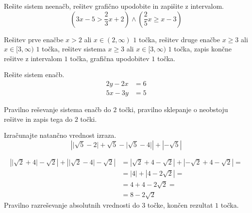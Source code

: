 \documentclass[addpoints]{exam}
\begin{document}
\begin{questions}
        

    \newpage
    \question[5]
    Rešite sistem neenačb, rešitev grafično upodobite in zapišite z intervalom.
    $$ \left(3x-5>\frac{2}{3}x+2\right)\land\left(\frac{2}{5}x\geq x-3\right) $$
    
    
    \begin{solution}[12cm]
        Rešitev prve enačbe $x>2$ ali $x\in(2,\infty)$ $1$ točka, rešitev druge enačbe $x\geq 3$ ali $x\in[3,\infty)$ $1$ točka, rešitev sistema $x\geq 3$ ali $x\in[3,\infty)$ $1$ točka, zapis končne rešitve z intervalom $1$ točka, grafična upodobitev $1$ točka.
    \end{solution}


    


    \question[4]
    Rešite sistem enačb.
    $$ \begin{aligned}
        2y-2x&=6 \\ 5x-3y&=5
    \end{aligned} $$
    
    
    \begin{solution}[6cm]
        Pravilno reševanje sistema enačb do $2$ točki, pravilno sklepanje o neobstoju rešitve in zapis tega do $2$ točki.
    \end{solution}



    
    




    \newpage 

    
    \question[5]
    Izračunajte natančno vrednost izraza.
    $$ \left\lvert \lvert\sqrt{5}-2\rvert+\sqrt{5} -  \lvert\sqrt{5}-4\rvert\right\rvert+\left\lvert-\sqrt{5}\right\rvert $$
    
    
    
    \begin{solution}[11cm]
        \begin{align*}
            \left\lvert \lvert\sqrt{2}+4\rvert-\sqrt{2}\right\rvert + \left\lvert \lvert\sqrt{2}-4\rvert-\sqrt{2}\right\rvert &=
            \left\lvert \sqrt{2}+4-\sqrt{2}\right\rvert + \left\lvert -\sqrt{2}+4-\sqrt{2}\right\rvert= \\
            &= \left\lvert 4\right\rvert + \left\lvert 4-2\sqrt{2}\right\rvert= \\
            &= 4+4-2\sqrt{2}= \\
            &= 8-2\sqrt{2}
        \end{align*}
        Pravilno razreševanje absolutnih vrednosti do $3$ točke, končen rezultat $1$ točka.
    \end{solution}





\end{questions}
\end{document}
